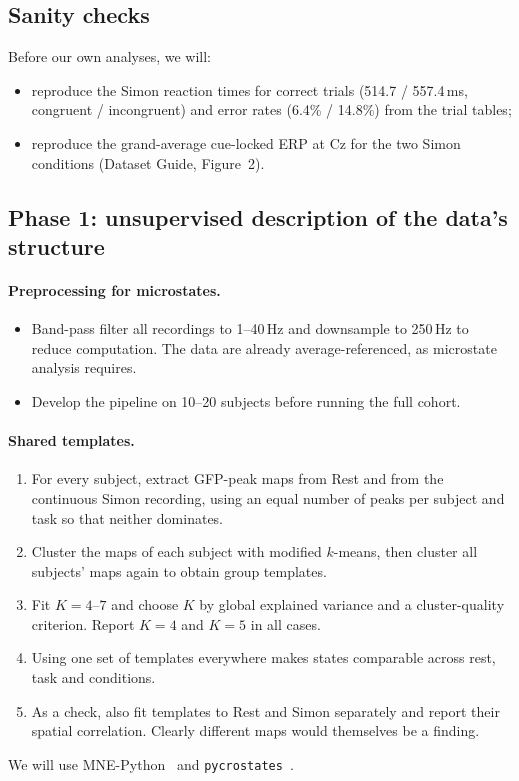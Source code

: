 \documentclass[11pt,a4paper]{article}
\begin{document}
\subsection{Sanity checks}

Before our own analyses, we will:
\begin{itemize}
  \item reproduce the Simon reaction times for correct trials (514.7 / 557.4\,ms, congruent / incongruent) and error rates (6.4\% / 14.8\%) from the trial tables;
  \item reproduce the grand-average cue-locked ERP at Cz for the two Simon conditions (Dataset Guide, Figure~2).
\end{itemize}

\subsection{Phase 1: unsupervised description of the data's structure}

\paragraph{Preprocessing for microstates.}
\begin{itemize}
  \item Band-pass filter all recordings to 1--40\,Hz and downsample to 250\,Hz to reduce computation. The data are already average-referenced, as microstate analysis requires.
  \item Develop the pipeline on 10--20 subjects before running the full cohort.
\end{itemize}

\paragraph{Shared templates.}
\begin{enumerate}
  \item For every subject, extract GFP-peak maps from Rest and from the continuous Simon recording, using an equal number of peaks per subject and task so that neither dominates.
  \item Cluster the maps of each subject with modified $k$-means, then cluster all subjects' maps again to obtain group templates.
  \item Fit $K = 4$--$7$ and choose $K$ by global explained variance and a cluster-quality criterion. Report $K=4$ and $K=5$ in all cases.
  \item Using one set of templates everywhere makes states comparable across rest, task and conditions.
  \item As a check, also fit templates to Rest and Simon separately and report their spatial correlation. Clearly different maps would themselves be a finding.
\end{enumerate}
We will use MNE-Python~\cite{gramfort2013} and \texttt{pycrostates}~\cite{ferat2022}.
\end{document}

